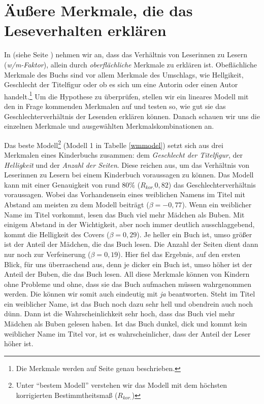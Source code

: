 \chapter{Äußere Merkmale, die das Leseverhalten erklären}

In  (siehe Seite \pageref{h5}) nehmen wir an, dass das
Verhältnis von Leserinnen zu Lesern (\emph{w/m-Faktor}), allein durch
\emph{oberflächliche} Merkmale zu erklären ist. Obeflächliche Merkmale
des Buchs sind vor allem Merkmale des Umschlags, wie Hellgikeit,
Geschlecht der Titelfigur oder ob es sich um eine Autorin oder einen
Autor
handelt.\footnote{Die Merkmale werden auf Seite \pageref{meth.merkmale} genau beschrieben.}
Um die Hypothese zu überprüfen, stellen wir ein lineares Modell mit den
in Frage kommenden Merkmalen auf und testen so, wie gut sie das
Geschlechterverhältnis der Lesenden erklären können. Danach schauen wir
uns die einzelnen Merkmale und ausgewählten Merkmalskombinationen an.

Das beste
Modell\footnote{Unter \enquote{bestem Modell} verstehen wir das Modell mit dem höchsten korrigierten Bestimmtheitsmaß (\(R_{kor.}\))}
(Modell 1 in Tabelle \ref{wmmodel}) setzt sich aus drei Merkmalen eines
Kinderbuchs zusammen: dem \emph{Geschlecht der Titelfigur}, der
\emph{Helligkeit} und der \emph{Anzahl der Seiten}. Diese reichen aus,
um das Verhältnis von Leserinnen zu Lesern bei einem Kinderbuch
voraussagen zu können. Das Modell kann mit einer Genauigkeit von rund
80\% ($R_{kor.}0{,}82$) das Geschlechterverhältnis voraussagen. Wobei
das Vorhandensein eines weiblichen Namens im Titel mit Abstand am
meisten zu dem Modell beiträgt ($\beta=-0{,}77$). Wenn ein weiblicher
Name im Titel vorkommt, lesen das Buch viel mehr Mädchen als Buben. Mit
einigem Abstand in der Wichtigkeit, aber noch immer deutlich
ausschlaggebend, kommt die Helligkeit des Covers ($\beta=0{,}29$). Je
heller ein Buch ist, umso größer ist der Anteil der Mädchen, die das
Buch lesen. Die Anzahl der Seiten dient dann nur noch zur Verfeinerung
($\beta=0{,}19$). Hier fiel das Ergebnis, auf den ersten Blick, für uns
überraschend aus, denn je dicker ein Buch ist, umso höher ist der Anteil
der Buben, die das Buch lesen. All diese Merkmale können von Kindern
ohne Probleme und ohne, dass sie das Buch aufmachen müssen wahrgenommen
werden. Die  können wir somit auch 
eindeutig mit \emph{ja} beantworten. Steht im Titel ein weiblicher Name,
ist das Buch noch dazu sehr hell und obendrein auch noch dünn. Dann ist
die Wahrscheinlichkeit sehr hoch, dass das Buch viel mehr Mädchen als
Buben gelesen haben. Ist das Buch dunkel, dick und kommt kein weiblicher
Name im Titel vor, ist es wahrscheinlicher, dass der Anteil der Leser
höher ist.

